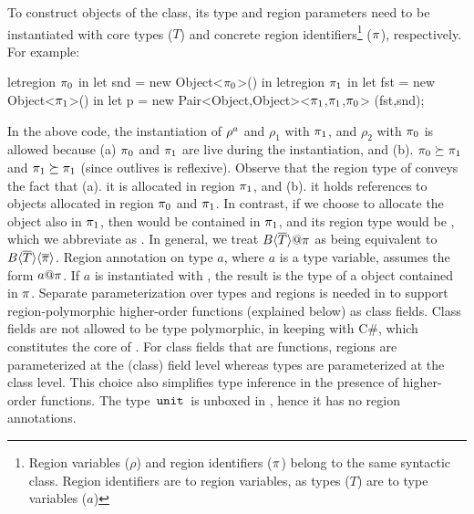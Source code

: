 To construct objects of the  class, its type and region
parameters need to be instantiated with core types ($T$) and concrete
region identifiers\footnote{Region variables ($\rho$) and region
identifiers ($\pi$) belong to the same syntactic class. Region
identifiers are to region variables, as types ($T$) are to type
variables ($a$)} ($\pi$), respectively. For example:
\begin{codejava}
letregion $\pi_0$ in
  let snd = new Object<$\pi_0$>() in
  letregion $\pi_1$ in
    let fst = new Object<$\pi_1$>() in
    let p = new Pair<Object,Object><$\pi_1$,$\pi_1$,$\pi_0$>
                  (fst,snd);
\end{codejava}
In the above code, the instantiation of $\rho^a$ and $\rho_1$ with
$\pi_1$, and $\rho_2$ with $\pi_0$ is allowed because (a) $\pi_0$
and $\pi_1$ are live during the instantiation, and (b). $\pi_0
\succeq \pi_1$ and $\pi_1 \succeq \pi_1$ (since outlives is
reflexive). Observe that the region type of  conveys
the fact that (a). it is allocated in region $\pi_1$, and (b). it
holds references to objects allocated in region $\pi_0$ and $\pi_1$.
In contrast, if we choose to allocate the  object also in
$\pi_1$, then  would be contained in $\pi_1$, and its region
type would be , which
we abbreviate as . In general, we treat
$B\inang{\tbar}@\rgn$ as being equivalent to
$B\langle \overline{T} \rangle\langle \overline{\pi} \rangle$. Region annotation on type $a$, where
$a$ is a type variable, assumes the form $a@\pi$. If $a$ is
instantiated with , the result is the type of a
 object contained in  $\pi$. Separate parameterization over
types and regions is needed in \FB to support region-polymorphic
higher-order functions (explained below) as class fields. Class fields
are not allowed to be type polymorphic, in keeping with C\#, which
constitutes the core of \name. For class fields that are functions,
regions are parameterized at the (class) field level whereas types are
parameterized at the class level.  This choice also simplifies type
inference in the presence of higher-order functions. The type $\,{\tt unit}\,$
is unboxed in \FB, hence it has no region annotations.


